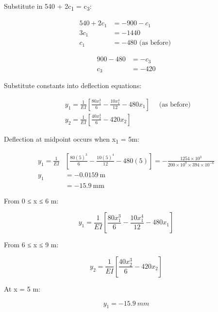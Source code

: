 \documentclass[
  letterpaper,
  DIV=11,
  numbers=noendperiod]{scrreprt}
\begin{document}
\begin{tcolorbox}
\begin{tcolorbox}
Substitute in 540 + 2c\textsubscript{1} = c\textsubscript{3}:

\[
\begin{aligned} 540+2 c_1 & =-900-c_1 \\ 3 c_1 & =-1440 \\ c_1 & =-480 \text { (as before) }\end{aligned}
\]

\[
\begin{aligned} 900-480 & =-c_3 \\ c_3 & =-420\end{aligned}
\]

Substitute constants into deflection equations:

\[
\begin{aligned} & y_1=\frac{1}{EI}\left[\frac{80 x_1^3}{6}-\frac{10 x_1^4}{12}-480 x_1\right] \quad \text { (as before) } \\ & y_2=\frac{1}{E I}\left[\frac{40 x_2^3}{6}-420 x_2\right]\end{aligned}
\]

Deflection at midpoint occurs when x\textsubscript{1} = 5m:

\[
\begin{aligned}y_1=\frac{1}{EI} & {\left[\frac{80(5)^3}{6}-\frac{10(5)^4}{12}-480(5)\right]=-\frac{1254 \times 10^3}{200 \times 10^9 \times 394 \times 10^{-6}} } \\y_1 & =-0.0159 \mathrm{~m} \\& =-15.9 \mathrm{~mm}\end{aligned}
\]

\end{tcolorbox}

\begin{tcolorbox}[enhanced jigsaw, colback=white, colframe=quarto-callout-note-color-frame, leftrule=.75mm, opacitybacktitle=0.6, colbacktitle=quarto-callout-note-color!10!white, arc=.35mm, bottomrule=.15mm, breakable, title={Answer only}, left=2mm, titlerule=0mm, toptitle=1mm, toprule=.15mm, opacityback=0, rightrule=.15mm, coltitle=black, bottomtitle=1mm]

From 0 ≤ x ≤ 6 m:

\[
y_1=\frac{1}{E I}\left[\frac{80 x_1^3}{6}-\frac{10 x_1^4}{12}-480 x_1\right]
\]

From 6 ≤ x ≤ 9 m:

\[
y_2=\frac{1}{E I}\left[\frac{40 x_2^3}{6}-420 x_2\right]
\]

At x = 5 m:

\[
y_1=-15.9~mm
\]

\end{tcolorbox}

\end{tcolorbox}
\end{document}

